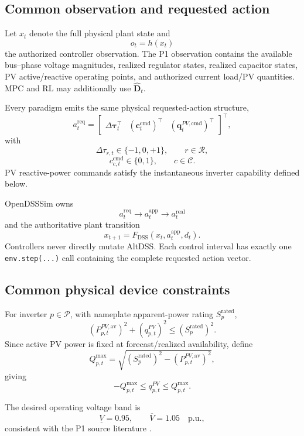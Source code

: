 \subsection{Common observation and requested action}
\label{subsec:p1_obs_action}

Let $x_t$ denote the full physical plant state and
\[
o_t=h(x_t)
\]
the authorized controller observation.  The P1 observation contains the available
bus--phase voltage magnitudes, realized regulator states, realized capacitor states, PV
active/reactive operating points, and authorized current load/PV quantities.  MPC and RL
may additionally use $\widehat{\mathbf D}_t$.

Every paradigm emits the same physical requested-action structure,
\[
a_t^{\mathrm{req}}
=
\begin{bmatrix}
\Delta\boldsymbol\tau_t^\top &
(\mathbf c_t^{\mathrm{cmd}})^\top &
(\mathbf q_t^{PV,\mathrm{cmd}})^\top
\end{bmatrix}^{\top},
\]
with
\[
\Delta\tau_{r,t}\in\{-1,0,+1\},
\qquad r\in\mathcal R,
\]
\[
c_{c,t}^{\mathrm{cmd}}\in\{0,1\},
\qquad c\in\mathcal C.
\]
PV reactive-power commands satisfy the instantaneous inverter capability defined below.

OpenDSSSim owns
\[
a_t^{\mathrm{req}}
\longrightarrow
a_t^{\mathrm{app}}
\longrightarrow
a_t^{\mathrm{real}}
\]
and the authoritative plant transition
\[
x_{t+1}
=
F_{\mathrm{DSS}}
\!\left(
x_t,a_t^{\mathrm{app}},d_t
\right).
\]
Controllers never directly mutate AltDSS.  Each control interval has exactly one
\texttt{env.step(...)} call containing the complete requested action vector.

\subsection{Common physical device constraints}
\label{subsec:p1_device_constraints}

For inverter $p\in\mathcal P$, with nameplate apparent-power rating
$S_p^{\mathrm{rated}}$,
\[
\left(P_{p,t}^{PV,\mathrm{av}}\right)^2
+
\left(q_{p,t}^{PV}\right)^2
\le
\left(S_p^{\mathrm{rated}}\right)^2.
\]
Since active PV power is fixed at forecast/realized availability, define
\[
Q_{p,t}^{\max}
=
\sqrt{
\left(S_p^{\mathrm{rated}}\right)^2
-
\left(P_{p,t}^{PV,\mathrm{av}}\right)^2
},
\]
giving
\[
-Q_{p,t}^{\max}
\le
q_{p,t}^{PV}
\le
Q_{p,t}^{\max}.
\]

The desired operating voltage band is
\[
\underline V=0.95,
\qquad
\overline V=1.05
\quad\mathrm{p.u.},
\]
consistent with the P1 source literature
\cite{fan2022powergym,erazo2022model,lee2022graph}.


